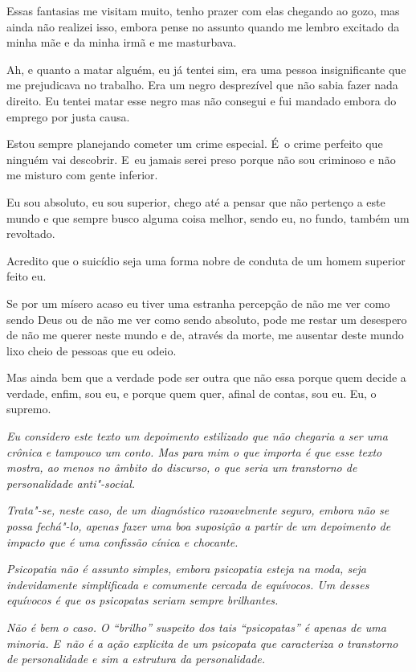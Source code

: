 Essas fantasias me visitam muito, tenho prazer com elas chegando ao
gozo, mas ainda não realizei isso, embora pense no assunto quando me
lembro excitado da minha mãe e da minha irmã e me masturbava.

Ah, e quanto a matar alguém, eu já tentei sim, era uma pessoa
insignificante que me prejudicava no trabalho. Era um negro desprezível
que não sabia fazer nada direito. Eu tentei matar esse negro mas não
consegui e fui mandado embora do emprego por justa causa.

Estou sempre planejando cometer um crime especial. É~o crime perfeito
que ninguém vai descobrir. E~eu jamais serei preso porque não sou
criminoso e não me misturo com gente inferior.

Eu sou absoluto, eu sou superior, chego até a pensar que não pertenço a
este mundo e que sempre busco alguma coisa melhor, sendo eu, no fundo,
também um revoltado.

Acredito que o suicídio seja uma forma nobre de conduta de um homem
superior feito eu.

Se por um mísero acaso eu tiver uma estranha percepção de não me ver
como sendo Deus ou de não me ver como sendo absoluto, pode me restar um
desespero de não me querer neste mundo e de, através da morte, me
ausentar deste mundo lixo cheio de pessoas que eu odeio.

Mas ainda bem que a verdade pode ser outra que não essa porque quem
decide a verdade, enfim, sou eu, e porque quem quer, afinal de contas,
sou eu. Eu, o supremo.~

\begin{center}\asterisc{}\end{center}


\emph{Eu considero este texto um depoimento estilizado que não chegaria
a ser uma crônica e tampouco um conto. Mas para mim o que importa é que
esse texto mostra, ao menos no âmbito do discurso, o que seria um
transtorno de personalidade anti"-social.}~

\emph{Trata"-se, neste caso, de um diagnóstico razoavelmente seguro,
embora não se possa fechá"-lo, apenas fazer uma boa suposição a partir de
um depoimento de impacto que é uma confissão cínica e chocante.}~

\emph{Psicopatia não é assunto simples, embora psicopatia esteja na
moda, seja indevidamente simplificada e comumente cercada de equívocos.
Um desses equívocos é que os psicopatas seriam sempre brilhantes.}~

\emph{Não é bem o caso. O ``brilho'' suspeito dos tais ``psicopatas'' é
apenas de uma minoria. E~não é a ação explicita de um psicopata que
caracteriza o transtorno de personalidade e sim a estrutura da
personalidade.}~


